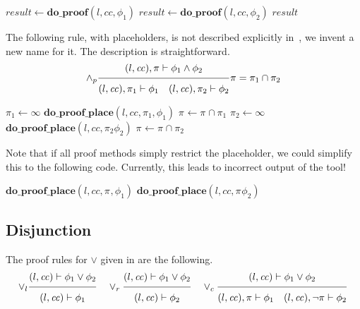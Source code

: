 \documentclass{article}
\newcommand{\proofrule}[3][]{#1 \frac{\raisebox{.7ex}{\normalsize{$#2$}}}
  {\raisebox{-1.0ex}{\normalsize{$#3$}}}}
\newcommand{\placeholder}[1][]{\pi_{#1}}
\newcommand{\loc}{l}
\newcommand{\region}{\mathit{cc}}
\newcommand{\var}[1]{\ensuremath{\mathit{#1}}}
\newcommand{\method}[1]{\ensuremath{\mathbf{#1}}}
\begin{document}
\begin{algorithm}[H]
\caption{$\method{do\_proof\_and}(\loc, \region, \phi_1 \land \phi_2)$}
\begin{algorithmic}
\STATE $\var{result} \gets \method{do\_proof}(\loc, \region, \phi_1)$
\IF{\var{result}}
  \STATE $\var{result} \gets \method{do\_proof}(\loc, \region, \phi_2)$
\ENDIF
\RETURN \var{result}
\end{algorithmic}
\end{algorithm}

The following rule, with placeholders, is not described explicitly in~\cite{FC:14,FC:14report}, we invent a new name for it. The description is straightforward.
\[
\proofrule[\land_p]
{(\loc, \region), \placeholder \vdash \phi_1 \land \phi_2}
{(\loc, \region), \placeholder[1] \vdash \phi_1
\quad (\loc, \region), \placeholder[2] \vdash \phi_2}
\placeholder = \placeholder[1] \cap \placeholder[2]
\]

\begin{algorithm}[H]
\caption{$\method{do\_proof\_place\_and}(\loc, \region, \placeholder, \phi_1 \land \phi_2)$}
\begin{algorithmic}
\STATE $\placeholder[1] \gets \infty$
\STATE $\method{do\_proof\_place}(\loc, \region, \placeholder[1], \phi_1)$
\STATE $\placeholder \gets \placeholder \cap \placeholder[1]$
\IF{$\placeholder = \emptyset$}
  \STATE $\placeholder[2] \gets \infty$
  \STATE $\method{do\_proof\_place}(\loc, \region, \placeholder[2] \phi_2)$
  \STATE $\placeholder \gets \placeholder \cap \placeholder[2]$
\ENDIF
\end{algorithmic}
\end{algorithm}
Note that if all proof methods simply restrict the placeholder, we could simplify this to the following code.
Currently, this leads to incorrect output of the tool!
\begin{algorithm}[H]
\caption{$\method{do\_proof\_place\_and}(\loc, \region, \placeholder, \phi_1 \land \phi_2)$}
\begin{algorithmic}
\STATE $\method{do\_proof\_place}(\loc, \region, \placeholder, \phi_1)$
\IF{$\placeholder = \emptyset$}
  \STATE $\method{do\_proof\_place}(\loc, \region, \placeholder \phi_2)$
\ENDIF
\end{algorithmic}
\end{algorithm}

\subsection{Disjunction}
The proof rules for $\lor$ given in \cite{FC:14} are the following.
\[
\proofrule[\lor_l]
{(\loc, \region) \vdash \phi_1 \lor \phi_2}
{(\loc, \region) \vdash \phi_1}
%
\quad
\proofrule[\lor_r]
{(\loc, \region) \vdash \phi_1 \lor \phi_2}
{(\loc, \region) \vdash \phi_2}
\quad
\proofrule[\lor_c]
{(\loc, \region) \vdash \phi_1 \lor \phi_2}
{(\loc, \region), \placeholder \vdash \phi_1
\quad
(\loc, \region), \lnot \placeholder \vdash \phi_2
}
\]
\end{document}
